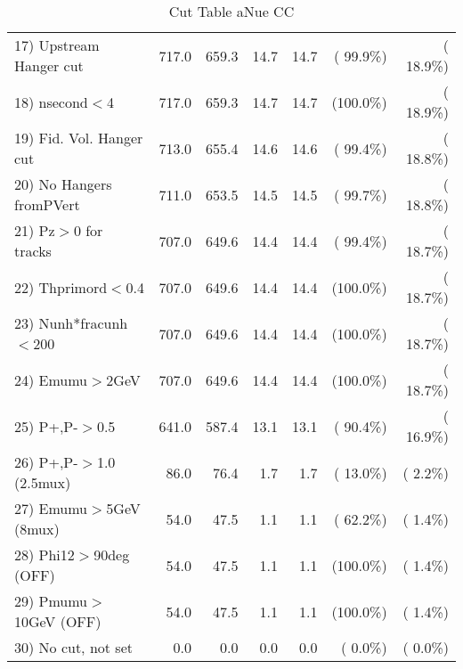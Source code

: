 \begin{table}[h!]
\begin{tabular}{||l||r|r|r|r|r|r||}
 17) Upstream Hanger cut  &        717.0 &        659.3 &         14.7 &         14.7 & ( 99.9\%) & ( 18.9\%) \\
 18) nsecond$<$4          &        717.0 &        659.3 &         14.7 &         14.7 & (100.0\%) & ( 18.9\%) \\
 19) Fid. Vol. Hanger cut &        713.0 &        655.4 &         14.6 &         14.6 & ( 99.4\%) & ( 18.8\%) \\
 20) No Hangers fromPVert &        711.0 &        653.5 &         14.5 &         14.5 & ( 99.7\%) & ( 18.8\%) \\
 21) Pz$>$0 for tracks    &        707.0 &        649.6 &         14.4 &         14.4 & ( 99.4\%) & ( 18.7\%) \\
 22) Thprimord$<$0.4      &        707.0 &        649.6 &         14.4 &         14.4 & (100.0\%) & ( 18.7\%) \\
 23) Nunh*fracunh$<$200   &        707.0 &        649.6 &         14.4 &         14.4 & (100.0\%) & ( 18.7\%) \\
 24) Emumu$>$2GeV         &        707.0 &        649.6 &         14.4 &         14.4 & (100.0\%) & ( 18.7\%) \\
 25) P+,P-$>$0.5          &        641.0 &        587.4 &         13.1 &         13.1 & ( 90.4\%) & ( 16.9\%) \\
 26) P+,P-$>$1.0 (2.5mux) &         86.0 &         76.4 &          1.7 &          1.7 & ( 13.0\%) & (  2.2\%) \\
 27) Emumu$>$5GeV  (8mux) &         54.0 &         47.5 &          1.1 &          1.1 & ( 62.2\%) & (  1.4\%) \\
 28) Phi12$>$90deg  (OFF) &         54.0 &         47.5 &          1.1 &          1.1 & (100.0\%) & (  1.4\%) \\
 29) Pmumu$>$10GeV  (OFF) &         54.0 &         47.5 &          1.1 &          1.1 & (100.0\%) & (  1.4\%) \\
 30) No cut, not set      &          0.0 &          0.0 &          0.0 &          0.0 & (  0.0\%) & (  0.0\%) \\
 \hline
 \hline
 \end{tabular}
 \caption{Cut Table  aNue CC  }
 \label{tab-cutheavy_neutrino_3.000}
 \end{table}
